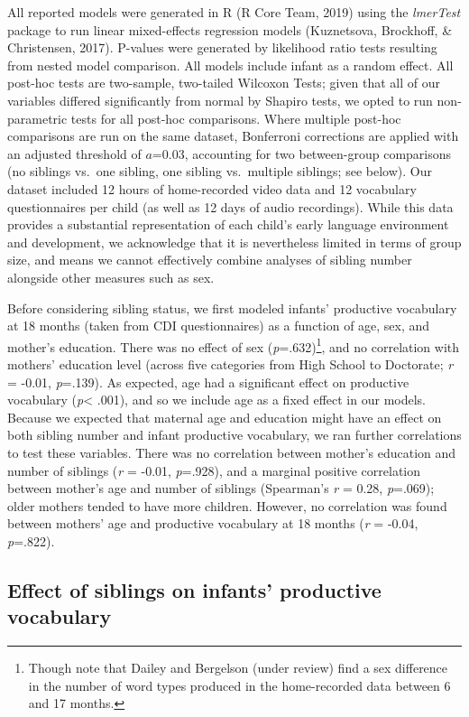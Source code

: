 \documentclass[
  man,floatsintext]{apa6}
\begin{document}
All reported models were generated in R (R Core Team, 2019) using the \emph{lmerTest} package to run linear mixed-effects regression models (Kuznetsova, Brockhoff, \& Christensen, 2017). P-values were generated by likelihood ratio tests resulting from nested model comparison. All models include infant as a random effect. All post-hoc tests are two-sample, two-tailed Wilcoxon Tests; given that all of our variables differed significantly from normal by Shapiro tests, we opted to run non-parametric tests for all post-hoc comparisons. Where multiple post-hoc comparisons are run on the same dataset, Bonferroni corrections are applied with an adjusted threshold of \(a\)=0.03, accounting for two between-group comparisons (no siblings vs.~one sibling, one sibling vs.~multiple siblings; see below). Our dataset included 12 hours of home-recorded video data and 12 vocabulary questionnaires per child (as well as 12 days of audio recordings). While this data provides a substantial representation of each child's early language environment and development, we acknowledge that it is nevertheless limited in terms of group size, and means we cannot effectively combine analyses of sibling number alongside other measures such as sex.

Before considering sibling status, we first modeled infants' productive vocabulary at 18 months (taken from CDI questionnaires) as a function of age, sex, and mother's education. There was no effect of sex (\emph{p}=.632)\footnote{Though note that Dailey and Bergelson (under review) find a sex difference in the number of word types produced in the home-recorded data between 6 and 17 months.}, and no correlation with mothers' education level (across five categories from High School to Doctorate; \emph{r} = -0.01, \emph{p}=.139). As expected, age had a significant effect on productive vocabulary (\emph{p}\textless{} .001), and so we include age as a fixed effect in our models. Because we expected that maternal age and education might have an effect on both sibling number and infant productive vocabulary, we ran further correlations to test these variables. There was no correlation between mother's education and number of siblings (\emph{r} = -0.01, \emph{p}=.928), and a marginal positive correlation between mother's age and number of siblings (Spearman's \emph{r} = 0.28, \emph{p}=.069); older mothers tended to have more children. However, no correlation was found between mothers' age and productive vocabulary at 18 months (\emph{r} = -0.04, \emph{p}=.822).

\hypertarget{effect-of-siblings-on-infants-productive-vocabulary}{%
\subsection{Effect of siblings on infants' productive vocabulary}\label{effect-of-siblings-on-infants-productive-vocabulary}}
\end{document}
